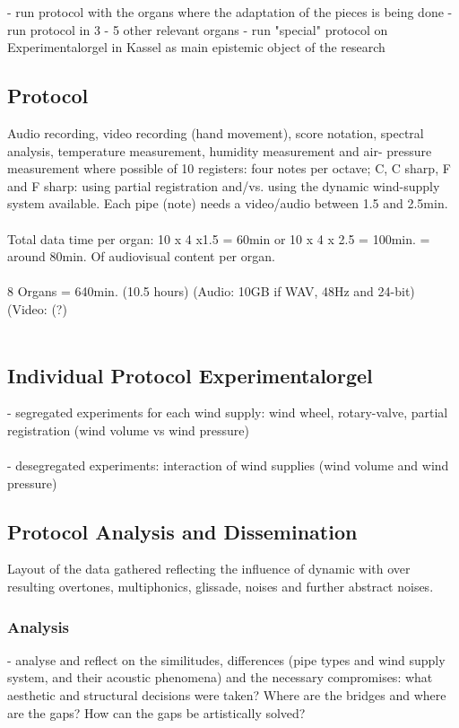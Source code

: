 - run protocol with the organs where the adaptation of the pieces is being done
- run protocol in 3 - 5 other relevant organs
- run "special" protocol on Experimentalorgel in Kassel as main epistemic object of the research 

\subsection{Protocol} 

Audio recording, video recording (hand movement), score notation, spectral analysis, temperature measurement, humidity measurement and air- pressure measurement where possible  of 10 registers: four notes per octave; C, C sharp, F and F sharp: using partial registration and/vs. using the dynamic wind-supply system available.
Each pipe (note) needs a video/audio between 1.5 and 2.5min. \\
\\
Total data time per organ: 10 x 4 x1.5 = 60min or 10 x 4 x 2.5 = 100min. = around 80min. Of audiovisual content per organ. \\
\\
8 Organs = 640min. (10.5 hours) (Audio: 10GB if WAV, 48Hz and 24-bit) (Video: (?)\\
\\
\subsection{Individual Protocol Experimentalorgel}

- segregated experiments for each wind supply: wind wheel, rotary-valve, partial registration (wind volume vs wind pressure)\\
\\
- desegregated experiments: interaction of wind supplies (wind volume and wind pressure)

\subsection{Protocol Analysis and Dissemination}

Layout of the data gathered reflecting the influence of dynamic with over resulting overtones, multiphonics, glissade, noises and further  abstract noises. 

\subsubsection{Analysis}

- analyse and reflect on the similitudes, differences (pipe types and wind supply system, and their acoustic phenomena) and the necessary compromises: what aesthetic and structural decisions were taken? Where are the bridges and where are the gaps? How can the gaps be artistically solved?\\
\\



